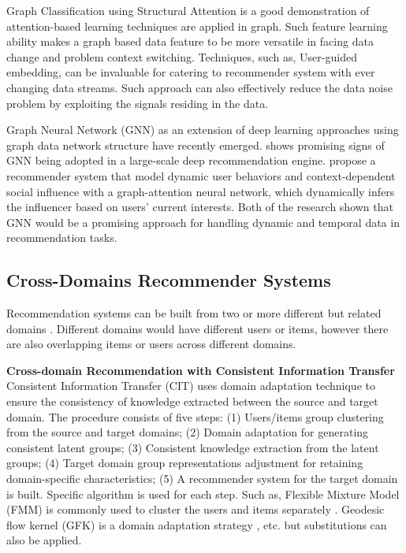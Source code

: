 Graph Classification using Structural Attention \citep{lee2018graph} is a good demonstration of attention-based learning techniques are applied in graph. Such feature learning ability makes a graph based data feature to be more versatile in facing data change and problem context switching. 
Techniques, such as, User-guided embedding, can be invaluable for catering to recommender system with ever changing data streams. Such approach can also effectively reduce the data noise problem by exploiting the signals residing in the data.  

Graph Neural Network (GNN) as an extension of deep learning approaches using graph data network structure have recently emerged. \citet{ying2018graph} shows promising signs of GNN being adopted in a large-scale deep recommendation engine. \citet{song2019session} propose a recommender system that model dynamic user behaviors and context-dependent social influence with a graph-attention neural network, which dynamically infers the influencer based on users’ current interests. Both of the research shown that GNN would be a promising approach for handling dynamic and temporal data in recommendation tasks.

\subsection{Cross-Domains Recommender Systems}
Recommendation systems can be built from two or more different but related domains \citep{fernandez2012cross}. Different domains would have different users or items, however there are also overlapping items or users across different domains. 

\bigskip
\textbf{Cross-domain Recommendation with Consistent Information Transfer}
Consistent Information Transfer (CIT) uses domain adaptation technique to ensure the consistency of knowledge extracted between the source and target domain. 
The procedure consists of five steps: (1) Users/items group clustering from the source and target domains; (2) Domain adaptation for generating consistent latent groups; (3) Consistent knowledge extraction from the latent groups; (4) Target domain group representations adjustment for retaining domain-specific characteristics; (5) A recommender system for the target domain is built. Specific algorithm is used for each step. Such as, Flexible Mixture Model (FMM) is commonly used to cluster the users and items separately \citep{si2003flexible}. Geodesic flow kernel (GFK) is a domain adaptation strategy \citep{gong2014learning}, etc. but substitutions can also be applied.

